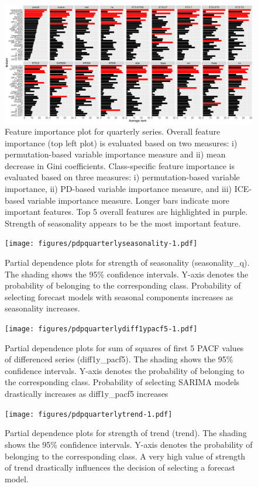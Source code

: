 \documentclass[11pt,a4paper,]{article}
\begin{document}
\begin{figure}
\centering
\includegraphics{figures/viquarterly-1.pdf}
\caption{\label{fig:viquarterly}Feature importance plot for quarterly series. Overall feature importance (top left plot) is evaluated based on two measures: i) permutation-based variable importance measure and ii) mean decrease in Gini coefficients. Class-specific feature importance is evaluated based on three measures: i) permutation-based variable importance, ii) PD-based variable importance measure, and iii) ICE-based variable importance measure. Longer bars indicate more important features. Top 5 overall features are highlighted in purple. Strength of seasonality appears to be the most important feature.}
\end{figure}

\begin{figure}
\centering
\texttt{[image: figures/pdpquarterlyseasonality-1.pdf]}
\caption{\label{fig:pdpquarterlyseasonality}Partial dependence plots for strength of seasonality (seasonality\_q). The shading shows the 95\% confidence intervals. Y-axis denotes the probability of belonging to the corresponding class. Probability of selecting forecast models with seasonal components increases as seasonality increases.}
\end{figure}

\begin{figure}
\centering
\texttt{[image: figures/pdpquarterlydiff1ypacf5-1.pdf]}
\caption{\label{fig:pdpquarterlydiff1ypacf5}Partial dependence plots for sum of squares of first 5 PACF values of differenced series (diff1y\_pacf5). The shading shows the 95\% confidence intervals. Y-axis denotes the probability of belonging to the corresponding class. Probability of selecting SARIMA models drastically increases as diff1y\_pacf5 increases}
\end{figure}

\begin{figure}
\centering
\texttt{[image: figures/pdpquarterlytrend-1.pdf]}
\caption{\label{fig:pdpquarterlytrend}Partial dependence plots for strength of trend (trend). The shading shows the 95\% confidence intervals. Y-axis denotes the probability of belonging to the corresponding class. A very high value of strength of trend drastically influences the decision of selecting a forecast model.}
\end{figure}
\end{document}
